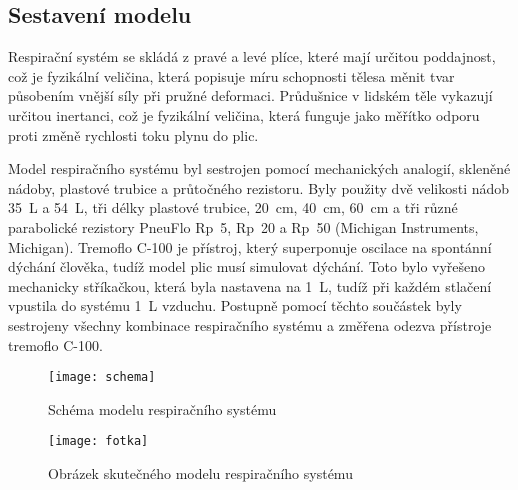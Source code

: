 \subsection{Sestavení modelu}
Respirační systém se skládá z pravé a levé plíce, které mají určitou poddajnost, což je fyzikální veličina, která popisuje míru schopnosti tělesa měnit tvar působením vnější síly při pružné deformaci. \cite{Poddajnost} Průdušnice v lidském těle vykazují určitou inertanci, což je fyzikální veličina, která funguje jako měřítko odporu proti změně rychlosti toku plynu do plic. \cite{Inertance}

 Model respiračního systému  byl sestrojen pomocí mechanických analogií, skleněné nádoby, plastové trubice a průtočného rezistoru. Byly použity dvě velikosti nádob \SI{35}{L} a \SI{54}{L}, tři délky plastové trubice, \SI{20}{cm},  \SI{40}{cm},  \SI{60}{cm}  a tři různé parabolické rezistory PneuFlo Rp~5, Rp~20 a Rp~50 (Michigan Instruments, Michigan). 
Tremoflo C-100 je přístroj, který superponuje oscilace na spontánní dýchání člověka, tudíž model plic musí simulovat dýchání. Toto bylo vyřešeno mechanicky stříkačkou, která byla nastavena na  \SI{1}{L}, tudíž při každém stlačení vpustila do systému  \SI{1}{L} vzduchu. 
Postupně pomocí těchto součástek byly sestrojeny všechny kombinace respiračního systému a změřena odezva přístroje tremoflo C-100.

\begin{figure}[!ht]
			\centering
 			\texttt{[image: schema]}
			\caption{Schéma modelu respiračního systému}
			 \label{obrazekschema}
 \end{figure}

\begin{figure}[!ht]
			\centering
 			\texttt{[image: fotka]}
			\caption{Obrázek skutečného modelu respiračního systému}
			 \label{obrazekreal}
 \end{figure}

\clearpage


